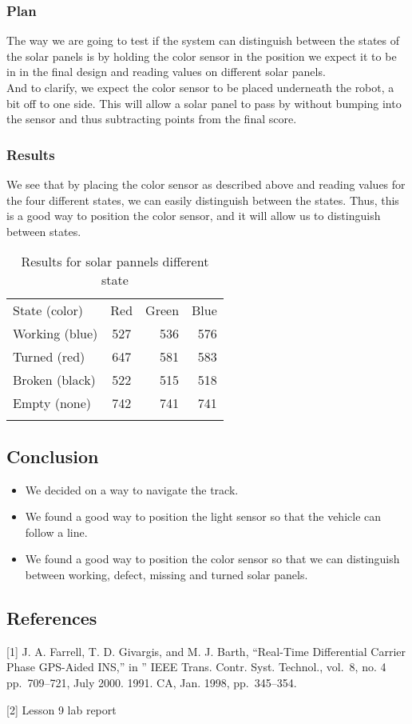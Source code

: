 \subsubsection{Plan}

The way we are going to test if the system can distinguish between the
states of the solar panels is by holding the color sensor in the
position we expect it to be in in the final design and reading values on
different solar panels.\\And to clarify, we expect the color sensor to
be placed underneath the robot, a bit off to one side. This will allow a
solar panel to pass by without bumping into the sensor and thus
subtracting points from the final score.

\subsubsection{Results}

We see that by placing the color sensor as described above and reading
values for the four different states, we can easily distinguish between
the states. Thus, this is a good way to position the color sensor, and
it will allow us to distinguish between states.

\begin{longtable}[c]{@{}lcrr@{}}
  \hline\noalign{\medskip} State (color) & Red & Green & Blue
  \\\noalign{\medskip} \hline\noalign{\medskip} Working (blue) & 527
  & 536 & 576 \\\noalign{\medskip} Turned (red) & 647 & 581 & 583
  \\\noalign{\medskip} Broken (black) & 522 & 515 & 518
  \\\noalign{\medskip} Empty (none) & 742 & 741 & 741
  \\\noalign{\medskip} \hline
\caption{Results for solar pannels different state}
\end{longtable}

\subsection{Conclusion}

\begin{itemize}
\itemsep1pt\parskip0pt
\item
  We decided on a way to navigate the track.
\item
  We found a good way to position the light sensor so that the vehicle
  can follow a line.
\item
  We found a good way to position the color sensor so that we can
  distinguish between working, defect, missing and turned solar panels.
\end{itemize}

\subsection{References}

{[}1{]} J. A. Farrell, T. D. Givargis, and M. J. Barth, ``Real-Time
Differential Carrier Phase GPS-Aided INS,'' in '' IEEE Trans. Contr.
Syst. Technol., vol.~8, no. 4 pp.~709--721, July 2000. 1991. CA, Jan.
1998, pp.~345--354.

{[}2{]} Lesson 9 lab report
